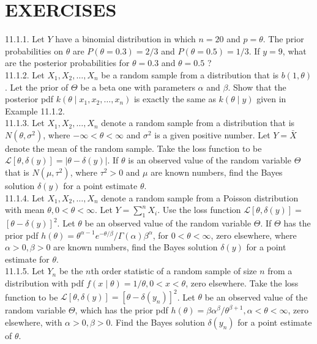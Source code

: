 \section*{EXERCISES}
11.1.1. Let $Y$ have a binomial distribution in which $n=20$ and $p=\theta$. The prior probabilities on $\theta$ are $P(\theta=0.3)=2 / 3$ and $P(\theta=0.5)=1 / 3$. If $y=9$, what are the posterior probabilities for $\theta=0.3$ and $\theta=0.5$ ?\\
11.1.2. Let $X_{1}, X_{2}, \ldots, X_{n}$ be a random sample from a distribution that is $b(1, \theta)$. Let the prior of $\Theta$ be a beta one with parameters $\alpha$ and $\beta$. Show that the posterior pdf $k\left(\theta \mid x_{1}, x_{2}, \ldots, x_{n}\right)$ is exactly the same as $k(\theta \mid y)$ given in Example 11.1.2.\\
11.1.3. Let $X_{1}, X_{2}, \ldots, X_{n}$ denote a random sample from a distribution that is $N\left(\theta, \sigma^{2}\right)$, where $-\infty<\theta<\infty$ and $\sigma^{2}$ is a given positive number. Let $Y=\bar{X}$ denote the mean of the random sample. Take the loss function to be $\mathcal{L}[\theta, \delta(y)]=|\theta-\delta(y)|$. If $\theta$ is an observed value of the random variable $\Theta$ that is $N\left(\mu, \tau^{2}\right)$, where $\tau^{2}>0$ and $\mu$ are known numbers, find the Bayes solution $\delta(y)$ for a point estimate $\theta$.\\
11.1.4. Let $X_{1}, X_{2}, \ldots, X_{n}$ denote a random sample from a Poisson distribution with mean $\theta, 0<\theta<\infty$. Let $Y=\sum_{1}^{n} X_{i}$. Use the loss function $\mathcal{L}[\theta, \delta(y)]=$ $[\theta-\delta(y)]^{2}$. Let $\theta$ be an observed value of the random variable $\Theta$. If $\Theta$ has the prior pdf $h(\theta)=\theta^{\alpha-1} e^{-\theta / \beta} / \Gamma(\alpha) \beta^{\alpha}$, for $0<\theta<\infty$, zero elsewhere, where $\alpha>0, \beta>0$ are known numbers, find the Bayes solution $\delta(y)$ for a point estimate for $\theta$.\\
11.1.5. Let $Y_{n}$ be the $n$th order statistic of a random sample of size $n$ from a distribution with pdf $f(x \mid \theta)=1 / \theta, 0<x<\theta$, zero elsewhere. Take the loss function to be $\mathcal{L}[\theta, \delta(y)]=\left[\theta-\delta\left(y_{n}\right)\right]^{2}$. Let $\theta$ be an observed value of the random variable $\Theta$, which has the prior pdf $h(\theta)=\beta \alpha^{\beta} / \theta^{\beta+1}, \alpha<\theta<\infty$, zero elsewhere, with $\alpha>0, \beta>0$. Find the Bayes solution $\delta\left(y_{n}\right)$ for a point estimate of $\theta$.\\
